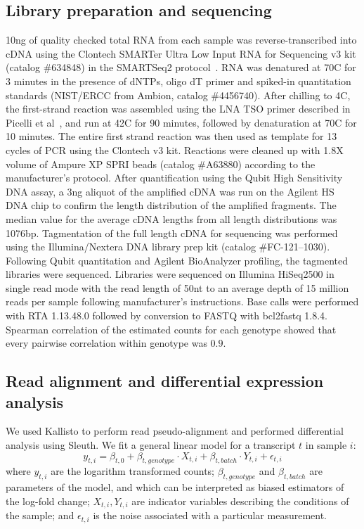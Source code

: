 \documentclass[10pt, onecolumn]{article}
\begin{document}
\subsection*{Library preparation and sequencing}
10ng of quality checked total RNA from each sample was reverse-transcribed into
cDNA using the Clontech SMARTer Ultra Low Input RNA for Sequencing v3 kit
(catalog \#634848) in the SMARTSeq2 protocol~\cite{Picelli2014}.  RNA was
denatured at 70\degree{}C for 3 minutes in the presence of dNTPs, oligo dT
primer and spiked-in quantitation standards (NIST/ERCC from Ambion, catalog
\#4456740).  After chilling to 4\degree{}C, the first-strand reaction was
assembled using the LNA TSO primer described in Picelli et al~\cite{Picelli2014},
and run at 42\degree{}C for 90 minutes, followed by denaturation at 70\degree{}C
for 10 minutes.  The entire first strand reaction was then used as template for
13 cycles of PCR using the Clontech v3 kit. Reactions were cleaned up with 1.8X
volume of Ampure XP SPRI beads (catalog \#A63880) according to the manufacturer’s
protocol.  After quantification using the Qubit High Sensitivity DNA assay, a
3ng aliquot of the amplified cDNA was run on the Agilent HS DNA chip to confirm
the length distribution of the amplified fragments.  The median value for the
average cDNA lengths from all length distributions was 1076bp.  Tagmentation of
the full length cDNA for sequencing was performed using the Illumina/Nextera DNA
library prep kit (catalog \#FC-121--1030). Following Qubit quantitation and
Agilent BioAnalyzer profiling, the tagmented libraries were sequenced. Libraries
were sequenced on Illumina HiSeq2500 in single read mode with the read length of
50nt to an average depth of 15 million reads per sample following manufacturer's
instructions. Base calls were performed with RTA 1.13.48.0 followed by conversion
to FASTQ with bcl2fastq 1.8.4. Spearman correlation of the estimated counts for
each genotype showed that every pairwise correlation within genotype was $0.9$.

\subsection*{Read alignment and differential expression analysis}
We used Kallisto to perform read pseudo-alignment and performed differential
analysis using Sleuth. We fit a general linear model for a transcript $t$ in
sample $i$:
\begin{equation}
  y_{t,i} = \beta_{t, 0} + \beta_{t, genotype}\cdot{}X_{t, i} +
  \beta_{t, batch}\cdot{}Y_{t, i} + \epsilon_{t, i}
\end{equation}
where $y_{t, i}$ are the logarithm transformed counts; $\beta_{t, genotype}$ and
$\beta_{t, batch}$ are parameters of the model, and which can be interpreted as
biased estimators of the log-fold change; $X_{t, i}, Y_{t, i}$ are indicator
variables describing the conditions of the sample; and $\epsilon_{t, i}$ is the
noise associated with a particular measurement.
\end{document}
